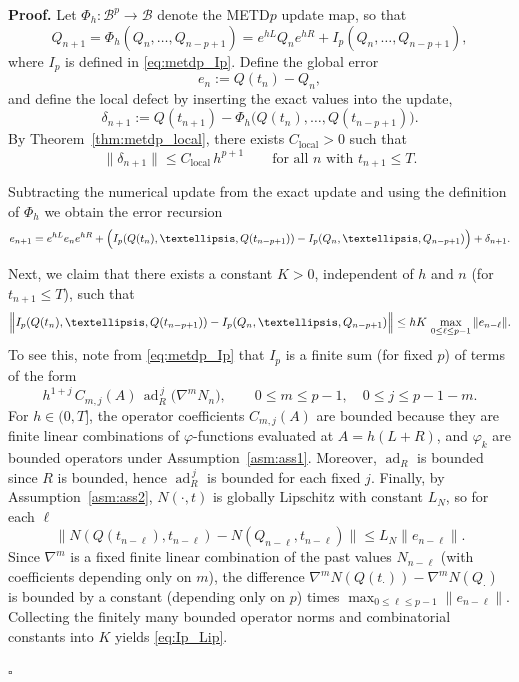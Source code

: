 \documentclass[12pt]{article}
\DeclareMathOperator{\ad}{ad}
\newenvironment{pf}{\noindent\textbf{Proof.}}{\hfill$\square$}
\begin{document}
\begin{pf}
Let $\Phi_h:\mathcal{B}^p\to\mathcal{B}$ denote the METD$p$ update map, so that
\begin{equation*}
Q_{n+1}=\Phi_h(Q_n,\ldots,Q_{n-p+1})
      = e^{hL}Q_ne^{hR} + I_p(Q_n,\ldots,Q_{n-p+1}),
\end{equation*}
where $I_p$ is defined in \eqref{eq:metdp_Ip}. Define the global error
\begin{equation*}
e_n := Q(t_n)-Q_n,
\end{equation*}
and define the local defect by inserting the exact values into the update,
\begin{equation*}
\delta_{n+1}
:= Q(t_{n+1})-\Phi_h\bigl(Q(t_n),\ldots,Q(t_{n-p+1})\bigr).
\end{equation*}
By Theorem~\ref{thm:metdp_local}, there exists $C_{\mathrm{local}}>0$ such that
\begin{equation}\label{eq:glob_loc_def}
\|\delta_{n+1}\|\le C_{\mathrm{local}}\,h^{p+1}
\qquad\text{for all }n\text{ with }t_{n+1}\le T.
\end{equation}

Subtracting the numerical update from the exact update and using the definition of $\Phi_h$ we obtain the error recursion
\begin{equation}\label{eq:err_decomp}
e_{n+1}
= e^{hL}e_ne^{hR}
+ \Bigl(I_p(Q(t_n),\ldots,Q(t_{n-p+1}))-I_p(Q_n,\ldots,Q_{n-p+1})\Bigr)
+ \delta_{n+1}.
\end{equation}

Next, we claim that there exists a constant $K>0$, independent of $h$ and $n$ (for $t_{n+1}\le T$),
such that
\begin{equation}\label{eq:Ip_Lip}
\Bigl\|I_p(Q(t_n),\ldots,Q(t_{n-p+1}))-I_p(Q_n,\ldots,Q_{n-p+1})\Bigr\|
\le hK\,\max_{0\le \ell\le p-1}\|e_{n-\ell}\|.
\end{equation}
To see this, note from \eqref{eq:metdp_Ip} that $I_p$ is a finite sum (for fixed $p$) of terms of the form
\begin{equation*}
h^{1+j}\,C_{m,j}(A)\,\ad_R^{\,j}\bigl(\nabla^m N_n\bigr),
\qquad 0\le m\le p-1,\quad 0\le j\le p-1-m.
\end{equation*}
For $h\in(0,T]$, the operator coefficients $C_{m,j}(A)$ are bounded because they are finite linear
combinations of $\varphi$-functions evaluated at $A=h(L+R)$, and $\varphi_k$ are bounded operators under
Assumption~\ref{asm:ass1}. Moreover, $\ad_R$ is bounded since $R$ is bounded, hence $\ad_R^{\,j}$ is bounded for each
fixed $j$. Finally, by Assumption~\ref{asm:ass2}, $N(\cdot,t)$ is globally Lipschitz with constant $L_N$, so for each $\ell$
\begin{equation*}
\|N(Q(t_{n-\ell}),t_{n-\ell})-N(Q_{n-\ell},t_{n-\ell})\|\le L_N\|e_{n-\ell}\|.
\end{equation*}
Since $\nabla^m$ is a fixed finite linear combination of the past values $N_{n-\ell}$ (with coefficients depending only on $m$),
the difference $\nabla^m N(Q(t_\cdot))-\nabla^m N(Q_\cdot)$ is bounded by a constant (depending only on $p$) times
$\max_{0\le\ell\le p-1}\|e_{n-\ell}\|$. Collecting the finitely many bounded operator norms and combinatorial constants into $K$
yields \eqref{eq:Ip_Lip}.


\end{pf}
\end{document}
